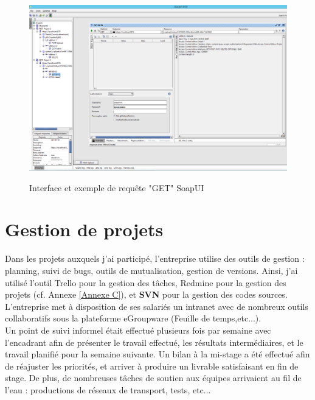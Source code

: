 \begin{center}
\begin{figure}[h] \centering
\includegraphics[width=16cm]{images/soapUI_getById_sansResponse_small.png}\\
\caption{\label{SoapUIGet} Interface et exemple de requête "GET" SoapUI}
\end{figure}
\end{center}


\section{Gestion de projets}

Dans les projets auxquels j'ai participé, l'entreprise utilise des outils de gestion : planning, suivi de bugs, outils de mutualisation, gestion de versions. Ainsi, j'ai utilisé l'outil Trello pour la gestion des tâches, Redmine pour la gestion des projets (cf. Annexe \ref{Annexe C}), et \textbf{SVN} pour la gestion des codes sources. L'entreprise met à disposition de ses salariés un intranet avec de nombreux outils collaboratifs sous la plateforme eGroupware (Feuille de temps,etc...).\\

Un point de suivi informel était effectué plusieurs fois par semaine avec l'encadrant afin de présenter le travail effectué, les résultats intermédiaires, et le travail planifié pour la semaine suivante. Un bilan à la mi-stage a été effectué afin de réajuster les priorités, et arriver à produire un livrable satisfaisant en fin de stage. De plus, de nombreuses tâches de soutien aux équipes arrivaient au fil de l'eau : productions de réseaux de transport, tests, etc...\\

